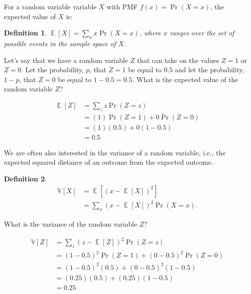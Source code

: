 \documentclass[12pt,leqno]{article}
\theoremstyle{newstyle}
\newtheorem{definition}{Definition}
\DeclareMathOperator{\E}{\mathbb{E}}
\begin{document}
For a random variable variable \(X\) with PMF
\(f(x) = \Pr\left(X = x\right)\), the expected value of \(X\) is:

\begin{definition}
$\E\left[X\right] = \sum_{x} x \Pr\left(X = x\right)$,
where $x$ ranges over the set of possible events in the sample space of $X$.
\end{definition}

Let's say that we have a random variable \(Z\) that can take on the
values \(Z = 1\) or \(Z = 0\). Let the probability, \(p\), that
\(Z = 1\) be equal to \(0.5\) and let the probability, \(1 - p\), that
\(Z = 0\) be equal to \(1 - 0.5 = 0.5\). What is the expected value of
the random variable \(Z\)?

\begin{align*}
\E\left[Z\right] & = \sum_{z} z \Pr\left(Z = z\right) \\
& = (1)\Pr\left(Z = 1\right) + 0\Pr\left(Z = 0\right) \\
& = (1)(0.5) + 0(1 - 0.5) \\
& = 0.5
\end{align*}

We are often also interested in the variance of a random variable, i.e.,
the expected squared distance of an outcome from the expected outcome.
\newcommand{\V}{\mathbb{V}}

\begin{definition}
\begin{align*}
\mathbb{V}\left[X\right] & = \E\left[\left(x - \E\left[X\right]\right)^2\right] \\
& = \sum_x \left(x - \E\left[X\right]\right)^2 \Pr\left(X = x\right).
\end{align*}
\end{definition}

What is the variance of the random variable \(Z\)?

\begin{align*}
\mathbb{V}\left[Z\right] & = \sum_z \left(z - \E\left[Z\right]\right)^2 \Pr\left(Z = z\right) \\
& = \left(1  - 0.5\right)^2 \Pr\left(Z = 1\right) + \left(0  - 0.5\right)^2 \Pr\left(Z = 0\right)  \\
& = \left(1  - 0.5\right)^2 \left(0.5\right) + \left(0  - 0.5\right)^2 \left(1 - 0.5\right) \\ 
& = \left(0.25\right) \left(0.5\right) + \left(0.25\right) \left(1 - 0.5\right) \\ 
& = 0.25
\end{align*}
\end{document}
